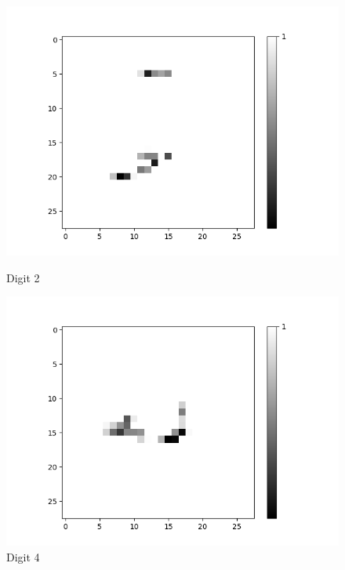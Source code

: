 \begin{figure}[H]
\begin{minipage}[b]{0.19\textwidth}
		\includegraphics[width=\textwidth]{AND-OLD(NO-LSM)/Layer0-Neuron-2.png}
		\caption{Digit 2}
	\end{minipage}
	\begin{minipage}[b]{0.19\textwidth}
		\includegraphics[width=\textwidth]{AND-OLD(NO-LSM)/Layer0-Neuron-4.png}
		\caption{Digit 4}
	\end{minipage}
	\begin{minipage}[b]{0.19\textwidth}

\end{minipage}
\end{figure}
